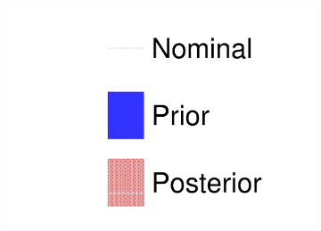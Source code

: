 \begin{figure}[h]
\begin{subfigure}[t]{0.32\textwidth}
		\includegraphics[width=\textwidth, trim={0mm 0mm 0mm 0mm}, clip, page=6]{figures/mach3/data/prior_error_1june_try_2017_fit_on_sk_spectra}
	\end{subfigure}
	

\end{figure}
